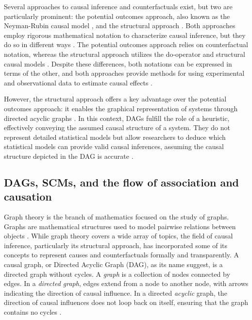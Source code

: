 \documentclass[
  authoryear,
  preprint,
  1p]{elsarticle}
\begin{document}
Several approaches to causal inference and counterfactuals exist, but
two are particularly prominent: the potential outcomes approach, also
known as the Neyman-Rubin causal model
\citep{Neyman_et_al_1923, Rubin_1974}, and the structural approach
\citep{Wright_1921, Pearl_2009, Pearl_et_al_2016}. Both approaches
employ rigorous mathematical notation to characterize causal inference,
but they do so in different ways \citep{Neal_2020}. The potential
outcomes approach relies on counterfactual notation, whereas the
structural approach utilizes the do-operator and structural causal
models \citep[SCM,][]{Pearl_2009, Pearl_et_al_2016}. Despite these
differences, both notations can be expressed in terms of the other, and
both approaches provide methods for using experimental and observational
data to estimate causal effects \citep{Pearl_2010}.

However, the structural approach offers a key advantage over the
potential outcomes approach: it enables the graphical representation of
systems through directed acyclic graphs
\citep[DAG,][]{Gross_et_al_2018, Neal_2020}. In this context, DAGs
fulfill the role of a heuristic, effectively conveying the assumed
causal structure of a system. They do not represent detailed statistical
models but allow researchers to deduce which statistical models can
provide valid causal inferences, assuming the causal structure depicted
in the DAG is accurate \citep{McElreath_2020}.

\subsection{DAGs, SCMs, and the flow of association and
causation}\label{sec-background-dag}

Graph theory is the branch of mathematics focused on the study of
graphs. Graphs are mathematical structures used to model pairwise
relations between objects \citep{Gross_et_al_2018}. While graph theory
covers a wide array of topics, the field of causal inference,
particularly its structural approach, has incorporated some of its
concepts to represent causes and counterfactuals formally and
transparently. A causal graph, or Directed Acyclic Graph (DAG), as its
name suggest, is a directed graph without cycles. A \emph{graph} is a
collection of nodes connected by edges. In a \emph{directed graph},
edges extend from a node to another node, with arrows indicating the
direction of causal influence. In a directed \emph{acyclic} graph, the
direction of causal influences does not loop back on itself, ensuring
that the graph contains no cycles \citep[@McElreath\_2020]{Neal_2020}.
\end{document}
